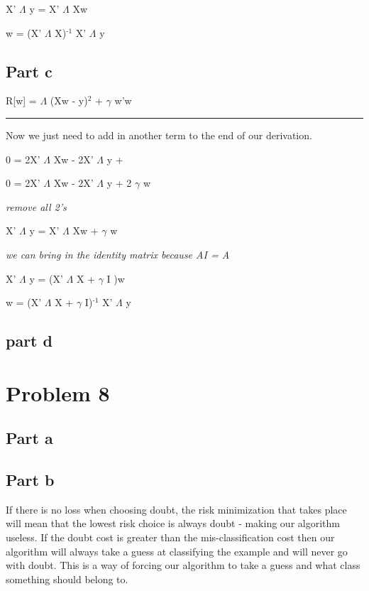 \documentclass[11pt]{article}
\begin{document}
X' $\Lambda$ y = X' $\Lambda$ Xw

w = (X' $\Lambda$ X)$^{\text{-1}}$ X' $\Lambda$ y

\subsection{Part c}
\label{sec-7-3}

R[w] = $\Lambda$ (Xw - y)$^{\text{2}}$ + $\gamma$ w'w

\rule{\linewidth}{0.5pt}

Now we just need to add in another term to the end of our derivation.

0 = 2X' $\Lambda$ Xw - 2X' $\Lambda$ y + 

0 = 2X' $\Lambda$ Xw - 2X' $\Lambda$ y + 2 $\gamma$ w

\emph{remove all 2's}

X' $\Lambda$ y = X' $\Lambda$ Xw + $\gamma$ w

\emph{we can bring in the identity matrix because AI = A}

X' $\Lambda$ y = (X' $\Lambda$ X + $\gamma$ I )w

w = (X' $\Lambda$ X + $\gamma$ I)$^{\text{-1}}$ X' $\Lambda$ y

\subsection{part d}
\label{sec-7-4}


\section{Problem 8}
\label{sec-8}

\subsection{Part a}
\label{sec-8-1}

\subsection{Part b}
\label{sec-8-2}
If there is no loss when choosing doubt, the risk minimization that takes place will mean that the lowest risk choice is always doubt - making our algorithm useless. If the doubt cost is greater than the mis-classification cost then our algorithm will always take a guess at classifying the example and will never go with doubt. This is a way of forcing our algorithm to take a guess and what class something should belong to.
\end{document}
